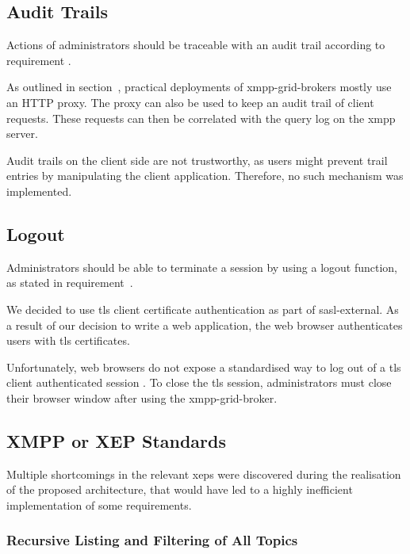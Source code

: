\subsection{Audit Trails}

Actions of administrators should be traceable with an audit trail according to requirement .

As outlined in section~, practical deployments of \glspl{xmpp-grid-broker} mostly use an HTTP proxy.
The proxy can also be used to keep an audit trail of client requests.
These requests can then be correlated with the query log on the \gls{xmpp} server.

Audit trails on the client side are not trustworthy, as users might prevent trail entries by manipulating the client application.
Therefore, no such mechanism was implemented.

\subsection{Logout}

Administrators should be able to terminate a session by using a logout function, as stated in requirement~.

We decided to use \gls{tls} client certificate authentication as part of \gls{sasl-external}.
As a result of our decision to write a web application, the web browser authenticates users with \gls{tls} certificates.

Unfortunately, web browsers do not expose a standardised way to log out of a \gls{tls} client authenticated session \cite{practical-issues-with-tls-client}.
To close the \gls{tls} session, administrators must close their browser window after using the \gls{xmpp-grid-broker}.

\subsection{XMPP or XEP Standards}

Multiple shortcomings in the relevant \glspl{xep} were discovered during the realisation of the proposed architecture, that would have led to a highly inefficient implementation of some requirements.

\subsubsection{Recursive Listing and Filtering of All Topics}

